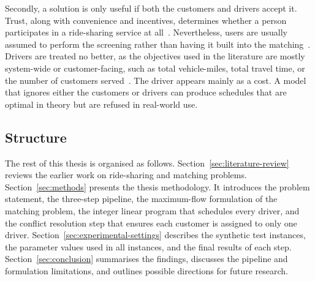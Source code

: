 Secondly, a solution is only useful if both the customers and drivers accept it. Trust, along with convenience and incentives, determines whether a person participates in a ride-sharing service at all~\citep{chaube2010trust}. Nevertheless, users are usually assumed to perform the screening rather than having it built into the matching~\citep{furuhata2013ridesharing}. Drivers are treated no better, as the objectives used in the literature are mostly system-wide or customer-facing, such as total vehicle-miles, total travel time, or the number of customers served~\citep{furuhata2013ridesharing,agatz2012optimization}. The driver appears mainly as a cost. A model that ignores either the customers or drivers can produce schedules that are optimal in theory but are refused in real-world use.

\subsection{Structure}

The rest of this thesis is organised as follows. Section~\ref{sec:literature-review} reviews the earlier work on ride-sharing and matching problems. Section~\ref{sec:methods} presents the thesis methodology. It introduces the problem statement, the three-step pipeline, the maximum-flow formulation of the matching problem, the integer linear program that schedules every driver, and the conflict resolution step that ensures each customer is assigned to only one driver. Section~\ref{sec:experimental-settings} describes the synthetic test instances, the parameter values used in all instances, and the final results of each step. Section~\ref{sec:conclusion} summarises the findings, discusses the pipeline and formulation limitations, and outlines possible directions for future research.
